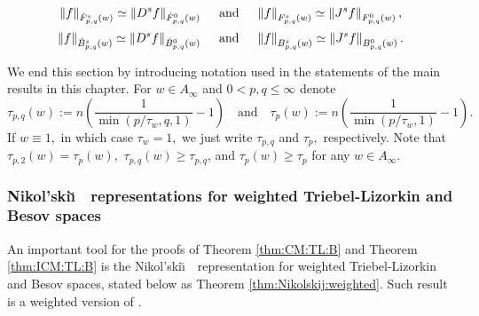  \begin{equation}\label{lifting_TL}
  \norm{f}{\tlw{p}{s}{q}{w}}\simeq\norm{D^s f}{\tlw{p}{0}{q}{w}} \quad \text{ and } \quad \norm{f}{\itlw{p}{s}{q}{w}}\simeq\norm{J^s f}{\itlw{p}{0}{q}{w}},
 \end{equation}
 \begin{equation}\label{lifting_B}
  \norm{f}{\besw{p}{s}{q}{w}}\simeq\norm{D^s f}{\besw{p}{0}{q}{w}} \quad \text{ and } \quad \norm{f}{\ibesw{p}{s}{q}{w}}\simeq\norm{J^s f}{\ibesw{p}{0}{q}{w}}.
 \end{equation}
 

We end this section by introducing notation used in the statements of the main results in this chapter. For $w\in A_\infty$ and  $0<p,q\le \infty$  denote 
\begin{equation}\label{def:tau_pq(w)}
\tau_{p,q}(w) := n \left(\frac{1}{\min(p/\tau_w,q,1)} - 1 \right)  \quad \text{and}\quad \tau_{p}(w):=n\left(\frac{1}{\min(p/\tau_w,1)}-1\right).
\end{equation} 
If $w\equiv 1,$ in which case $\tau_w=1,$ we just write $\tau_{p,q}$  and $\tau_p,$ respectively. Note  that $\tau_{p,2}(w)=\tau_p(w),$ $\tau_{p,q}(w)\ge \tau_{p,q}$, and $\tau_p(w)\ge \tau_p$ for any $w\in A_\infty.$

\subsubsection{Nikol'ski\u\i$\text{ }$ representations for weighted Triebel-Lizorkin and Besov spaces}

An important tool for the proofs of Theorem \ref{thm:CM:TL:B} and Theorem \ref{thm:ICM:TL:B} is the Nikol'ski\u\i$\text{ }$ representation for weighted Triebel-Lizorkin and Besov spaces, stated below as Theorem \ref{thm:Nikolskij:weighted}. Such result is a weighted version of \cite[Theorem 3.7]{MR837335}. 

